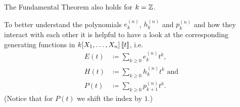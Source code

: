 \begin{rem}
  The Fundamental Theorem also holds for $k = \mathbb{Z}$.
\end{rem}


To better understand the polynomials $e^{(n)}_k$, $h^{(n)}_k$ and $p^{(n)}_k$ and how they interact with each other it is helpful to have a look at the corresponding generating functions in $k[X_1, \dotsc, X_n]\left[\!\left[t\right]\!\right]$, i.e.\
\begin{align*}
              E(t)
  &\coloneqq  \sum_{k \geq 0} e^{(n)}_k t^k,
  \\
              H(t)
  &\coloneqq  \sum_{k \geq 0} h^{(n)}_k t^k
  \text{ and}
  \\
              P(t)
  &\coloneqq  \sum_{k \geq 0} p^{(n)}_{k+1} t^k.
\end{align*}
(Notice that for $P(t)$ we shift the index by $1$.)


